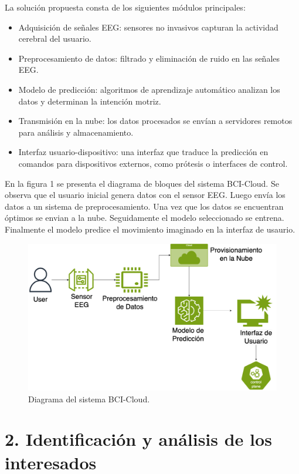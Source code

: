 \documentclass[
11pt, %
]{charter}
\begin{document}
La solución propuesta consta de los siguientes módulos principales:
\begin{itemize}
	\item Adquisición de señales EEG: sensores no invasivos capturan la actividad cerebral del usuario.
	\item Preprocesamiento de datos: filtrado y eliminación de ruido en las señales EEG.
	\item Modelo de predicción: algoritmos de aprendizaje automático analizan los datos y determinan la intención motriz.
	\item Transmisión en la nube: los datos procesados se envían a servidores remotos para análisis y almacenamiento.
	\item Interfaz usuario-dispositivo: una interfaz que traduce la predicción en comandos para dispositivos externos, como prótesis o interfaces de control.
\end{itemize}

En la figura 1 se presenta el diagrama de bloques del sistema BCI-Cloud. Se observa que el usuario inicial genera datos con el sensor EEG. Luego envía los datos a un sistema de preprocesamiento. 
Una vez que los datos se encuentran óptimos se envian a la nube. Seguidamente el modelo seleccionado se entrena. Finalmente el modelo predice el movimiento imaginado en la interfaz de usaurio.

\begin{figure}[htpb]
\centering 
\includegraphics[width=.65\textwidth]{./Figuras/block_diagram.png}
\caption{Diagrama del sistema BCI-Cloud.}
\label{fig:diagBloques}
\end{figure}

\vspace{25px}


\section{2. Identificación y análisis de los interesados}
\label{sec:interesados}
\end{document}
